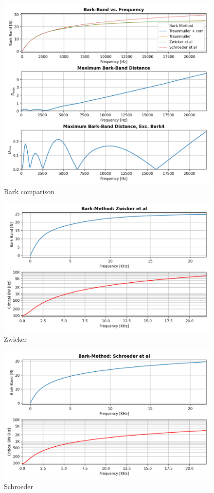 \begin{figure}[H]
    \centering
    \includegraphics[width=0.75\linewidth]{Experiments/images/bark_comparison2}
    \caption{Bark comparison}\label{fig:wer_23}
\end{figure}



\begin{figure}[H]
    \centering
    \includegraphics[width=0.75\linewidth]{Experiments/images/Zwicker}
    \caption{Zwicker}\label{fig:Zwicker}
\end{figure}

\begin{figure}[H]
    \centering
    \includegraphics[width=0.75\linewidth]{Experiments/images/Schroeder}
    \caption{Schroeder}\label{fig:Schroeder}
\end{figure}


